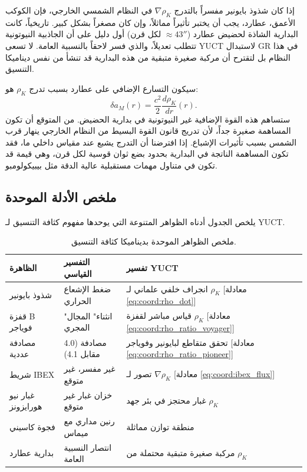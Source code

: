 \documentclass[11pt,a4paper]{article}
\theoremstyle{remark}
\begin{document}
	إذا كان شذوذ بايونير مفسراً بالتدرج $\nabla \rho_K$ في النظام الشمسي الخارجي، فإن الكوكب الأعمق، عطارد، يجب أن يختبر تأثيراً مماثلاً، وإن كان مصغراً بشكل كبير. تاريخياً، كانت البدارية الشاذة لحضيض عطارد ($ \approx 43''$ لكل قرن) أول دليل على أن الجاذبية النيوتونية تتطلب تعديلاً، والذي فسر لاحقاً بالنسبية العامة. لا تسعى YUCT لاستبدال GR في هذا النظام بل لتقترح أن مركبة صغيرة متبقية من هذه البدارية قد تنشأ من نفس ديناميكا التنسيق.
	
	سيكون التسارع الإضافي على عطارد بسبب تدرج $\rho_K$ هو:
	\begin{equation}
		\delta a_M(r) = \frac{c^2}{2} \frac{d\rho_K}{dr}(r).
	\end{equation}
	ستساهم هذه القوة الإضافية غير النيوتونية في بدارية الحضيض. من المتوقع أن تكون المساهمة صغيرة جداً، لأن تدريج قانون القوة البسيط من النظام الخارجي ينهار قرب الشمس بسبب تأثيرات الإشباع. إذا افترضنا أن التدرج يشبع عند مقياس داخلي ما، فقد تكون المساهمة الناتجة في البدارية بحدود بضع ثوان قوسية لكل قرن، وهي قيمة قد تكون في متناول مهمات مستقبلية عالية الدقة مثل بيبيكولومبو.
	
	\subsection{ملخص الأدلة الموحدة}
	
	يلخص الجدول أدناه الظواهر المتنوعة التي يوحدها مفهوم كثافة التنسيق لـ YUCT.
	
	\begin{table}[htbp]
		\centering
		\caption{ملخص الظواهر الموحدة بديناميكا كثافة التنسيق.}
		\label{tab:coord:summary}
		\begin{tabular}{|p{4.5cm}|p{4.5cm}|p{5cm}|}
			\hline
			\textbf{الظاهرة} & \textbf{التفسير القياسي} & \textbf{تفسير YUCT} \\
			\hline
			شذوذ بايونير & ضغط الإشعاع الحراري & انجراف خلفي علماني لـ $\rho_K$ [معادلة \ref{eq:coord:rho_dot}] \\
			\hline
			قفزة B فوياجر & "انثناء" المجال المجري & قياس مباشر لقفزة $\rho_K$ [معادلة \ref{eq:coord:rho_ratio_voyager}] \\
			\hline
			مصادفة عددية & مصادفة (4.0 مقابل 4.1) & تحقق متقاطع لبايونير وفوياجر [معادلة \ref{eq:coord:rho_ratio_pioneer}] \\
			\hline
			شريط IBEX & غير مفسر، غير متوقع & تصور لـ $\nabla \rho_K$ [معادلة \ref{eq:coord:ibex_flux}] \\
			\hline
			غبار نيو هورايزونز & خزان غبار غير متوقع & غبار محتجز في بئر جهد $\rho_K$ \\
			\hline
			فجوة كاسيني & رنين مداري مع ميماس & منطقة توازن مماثلة \\
			\hline
			بدارية عطارد & انتصار النسبية العامة & مركبة صغيرة متبقية محتملة من $\rho_K$ \\
			\hline
		\end{tabular}
	\end{table}
	
\end{document}
